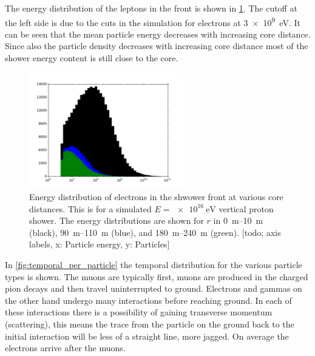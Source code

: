 The energy distribution of the leptons in the front is shown in \cref{fig:energy_front}. The cutoff at the left side is due to the cuts in the simulation for electrons at \SI{3e9}{\eV}. It can be seen that the mean particle energy decreases with increasing core distance. Since also the particle density decreases with increasing core distance most of the shower energy content is still close to the core.

\begin{figure}
    \centering
    \includegraphics[width=0.6\textwidth]
                    {plots/cosmic-rays/energy_front}
    \caption{Energy distribution of electrons in the shwower front at various core distances. This is for a simulated $E = \SI{e16}{\eV}$ vertical proton shower. The energy distributions are shown for $r$ in \SIrange{0}{10}{\meter} (black), \SIrange{90}{110}{\meter} (blue), and \SIrange{180}{240}{\meter} (green). \cite{heck2013corsika} [todo; axis labels, x: Particle energy, y: Particles]}
    \label{fig:energy_front}
\end{figure}


In \cref{fig:temporal_per_particle} the temporal distribution for the various particle types is shown. The muons are typically first, muons are produced in the charged pion decays and then travel uninterrupted to ground. Electrons and gammas on the other hand undergo many interactions before reaching ground. In each of these interactions there is a possibility of gaining transverse momentum (scattering), this means the trace from the particle on the ground back to the initial interaction will be less of a straight line, more jagged. On average the electrons arrive after the muons.

